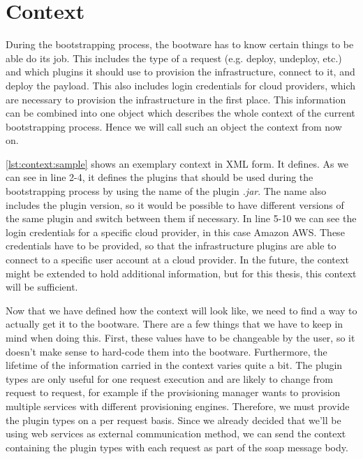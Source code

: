 \section{Context}
\label{context}

During the bootstrapping process, the bootware has to know certain things to be able do its job.
This includes the type of a request (e.g. deploy, undeploy, etc.) and which plugins it should use to provision the infrastructure, connect to it, and deploy the payload.
This also includes login credentials for cloud providers, which are necessary to provision the infrastructure in the first place.
This information can be combined into one object which describes the whole context of the current bootstrapping process.
Hence we will call such an object the context from now on.

\vspace{1em}

\autoref{lst:context:sample} shows an exemplary context in XML form.
It defines.
As we can see in line 2-4, it defines the plugins that should be used during the bootstrapping process by using the name of the plugin \textit{.jar}.
The name also includes the plugin version, so it would be possible to have different versions of the same plugin and switch between them if necessary.
In line 5-10 we can see the login credentials for a specific cloud provider, in this case Amazon AWS.
These credentials have to be provided, so that the infrastructure plugins are able to connect to a specific user account at a cloud provider.
In the future, the context might be extended to hold additional information, but for this thesis, this context will be sufficient.

Now that we have defined how the context will look like, we need to find a way to actually get it to the bootware.
There are a few things that we have to keep in mind when doing this.
First, these values have to be changeable by the user, so it doesn't make sense to hard-code them into the bootware.
Furthermore, the lifetime of the information carried in the context varies quite a bit.
The plugin types are only useful for one request execution and are likely to change from request to request, for example if the provisioning manager wants to provision multiple services with different provisioning engines.
Therefore, we must provide the plugin types on a per request basis.
Since we already decided that we'll be using web services as external communication method, we can send the context containing the plugin types with each request as part of the soap message body.

